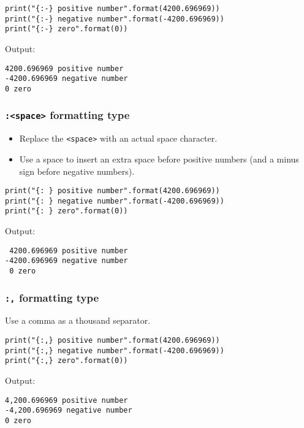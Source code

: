 \documentclass[11pt]{article}
\begin{document}
\begin{verbatim}
print("{:-} positive number".format(4200.696969))
print("{:-} negative number".format(-4200.696969))
print("{:-} zero".format(0))
\end{verbatim}

 \noindent Output:

\label{org324b348}
\begin{verbatim}
4200.696969 positive number
-4200.696969 negative number
0 zero
\end{verbatim}
\subsubsection{\texttt{:<space>} formatting type}
\label{sec:org9b71e51}
\begin{itemize}
\item Replace the \texttt{<space>} with an actual space character.
\item Use a space to insert an extra space before positive numbers (and a minus sign before negative numbers).
\end{itemize}

\begin{verbatim}
print("{: } positive number".format(4200.696969))
print("{: } negative number".format(-4200.696969))
print("{: } zero".format(0))
\end{verbatim}

 \noindent Output:

\label{orga2f2736}
\begin{verbatim}
 4200.696969 positive number
-4200.696969 negative number
 0 zero
\end{verbatim}
\subsubsection{\texttt{:,} formatting type}
\label{sec:org5ccf549}
Use a comma as a thousand separator.

\begin{verbatim}
print("{:,} positive number".format(4200.696969))
print("{:,} negative number".format(-4200.696969))
print("{:,} zero".format(0))
\end{verbatim}

 \noindent Output:

\label{orgf3bfa55}
\begin{verbatim}
4,200.696969 positive number
-4,200.696969 negative number
0 zero
\end{verbatim}
\end{document}
